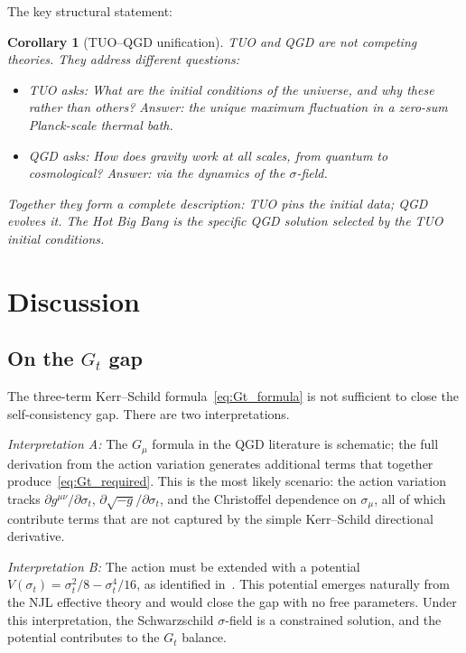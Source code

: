 \documentclass[11pt,a4paper]{article}
\theoremstyle{plain}
\newtheorem{corollary}[theorem]{Corollary}
\theoremstyle{definition}
\theoremstyle{remark}
\begin{document}
The key structural statement:

\begin{corollary}[TUO--QGD unification]
TUO and QGD are not competing theories.  They address different questions:
\begin{itemize}
  \item \emph{TUO asks:} What are the initial conditions of the universe,
    and why these rather than others?  Answer: the unique maximum fluctuation
    in a zero-sum Planck-scale thermal bath.
  \item \emph{QGD asks:} How does gravity work at all scales, from quantum
    to cosmological?  Answer: via the dynamics of the $\sigma$-field.
\end{itemize}
Together they form a complete description: TUO pins the initial data;
QGD evolves it.  The Hot Big Bang is the specific QGD solution selected
by the TUO initial conditions.
\end{corollary}

\section{Discussion}

\subsection{On the $G_t$ gap}

The three-term Kerr--Schild formula~\eqref{eq:Gt_formula} is not sufficient
to close the self-consistency gap.  There are two interpretations.

\emph{Interpretation A:} The $G_\mu$ formula in the QGD literature is
schematic; the full derivation from the action variation generates additional
terms that together produce~\eqref{eq:Gt_required}.  This is the most likely
scenario: the action variation tracks $\partial g^{\mu\nu}/\partial\sigma_t$,
$\partial\sqrt{-g}/\partial\sigma_t$, and the Christoffel dependence on
$\sigma_\mu$, all of which contribute terms that are not captured by the
simple Kerr--Schild directional derivative.

\emph{Interpretation B:} The action must be extended with a potential
$V(\sigma_t) = \sigma_t^2/8 - \sigma_t^4/16$, as identified
in~\cite{matshaba2026:kin_var}.  This potential emerges naturally from the
NJL effective theory and would close the gap with no free parameters.
Under this interpretation, the Schwarzschild $\sigma$-field is a
constrained solution, and the potential contributes to the $G_t$ balance.
\end{document}
